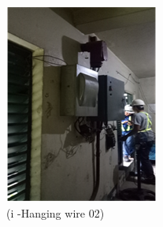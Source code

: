 \begin{figure}[!h]
\begin{minipage}[b]{0.22\linewidth}
		\includegraphics[width=\textwidth]{figures/fig_ch04_fdas_hangingwire02}
		\caption*{(i -Hanging wire 02)}
	\end{minipage}
	\hspace{0.03cm}
	\begin{minipage}[b]{0.22\linewidth}

\end{minipage}
\end{figure}
